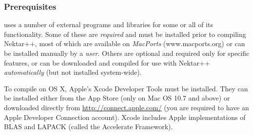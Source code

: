 \subsubsection{Prerequisites}
\nekpp uses a number of external programs and libraries for some or all of its
functionality. Some of these are \emph{required} and must be installed prior to
compiling Nektar++, most of which are available on \emph{MacPorts}
(www.macports.org) or can be installed manually by a \emph{user}. Others are
optional and required only for specific features, or can be downloaded and
compiled for use with Nektar++ \emph{automatically} (but not installed
system-wide).

\begin{notebox}
  To compile \nekpp on OS X, Apple's Xcode Developer Tools must be
  installed. They can be installed either from the App Store (only on Mac OS
  10.7 and above) or downloaded directly from
  \href{http://connect.apple.com/}{http://connect.apple.com/} (you are required
  to have an Apple Developer Connection account).  Xcode includes Apple
  implementations of BLAS and LAPACK (called the Accelerate Framework).
\end{notebox}

